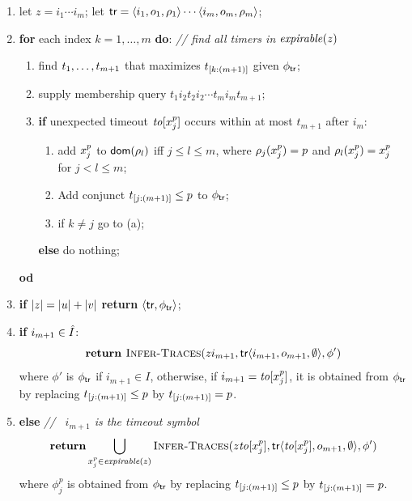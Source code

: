 \begin{enumerate}
\item
  let $z = i_1 \cdots i_m$;
  let $\textsf{tr} = \langle i_1,o_1,\rho_1\rangle\cdots\langle i_m,o_m,\rho_m\rangle$;
\item
  {\bf for} each index $k = 1, \ldots , m$ {\bf do}:
     \qquad \textit{// find all timers in $\mathit{expirable}(z)$}
  \begin{enumerate}
  \item
    find ${t}_1 , \ldots , {t}_{{m+1}}$ that maximizes $t_{[k:(m+1)]}$ given
    $\phi_{\textsf{tr}}$;
  \item
    supply membership query $t_1i_2t_2i_2 \cdots t_mi_mt_{m+1}$;
  \item
    {\bf if} unexpected timeout $\mathit{to}[x_{j}^{p}]$ occurs within at most
    $t_{m+1}$ after $i_m$:
    \begin{enumerate}
    \item
      add $x_{j}^{p}$ to ${\textsf{dom}}(\rho_l)$ iff
$j \leq l \leq m$, where $\rho_j(x_{j}^{p}) = p$ and
      $\rho_l(x_{j}^{p}) = x_{j}^{p}$ for $j < l \leq m$;
    \item
      Add conjunct 
      $t_{[j:(m+1)]} \leq p$ to $\phi_{\textsf{tr}}$;
    \item if $k \neq j$ go to (a);
    \end{enumerate}
    {\bf else} do nothing;
  \end{enumerate}
  {\bf od}
\item
  {\bf if} $|z| = |u| + |v|$ {\bf return}
  $\langle \textsf{tr},\phi_{\textsf{tr}}\rangle$;
\item
  {\bf if} $i_{m+1} \in \hat{I}$:
  \[  \textbf{return } \textsc{Infer-Traces}(zi_{m+1},\textsf{tr}\langle i_{m+1},o_{m+1},\emptyset\rangle,\phi')
  \]
  where $\phi'$ is $\phi_{\textsf{tr}}$ if $i_{m+1} \in I$, otherwise, if
  $i_{m+1} = \mathit{to}[x_{j}^{p}]$, it is obtained from $\phi_{\textsf{tr}}$
  by replacing $t_{[j:(m+1)]} \leq p$ by $t_{[j:(m+1)]} = p$.
  \item
  {\bf else} \hspace*{4cm} \textit{// \ $i_{m+1}$ is the timeout symbol}
    \[
    \textbf{return} \mathop\bigcup_{x_{j}^{p} \in \mathit{expirable}(z)}
     \textsc{Infer-Traces}(z\mathit{to}[x_{j}^{p}],\textsf{tr}\langle \mathit{to}[x_{j}^{p}],o_{m+1},\emptyset\rangle,\phi')
     \]
  where  $\phi_j^p$ is obtained from $\phi_{\textsf{tr}}$
  by replacing $t_{[j:(m+1)]} \leq p$ by $t_{[j:(m+1)]} = p$.
\end{enumerate}

